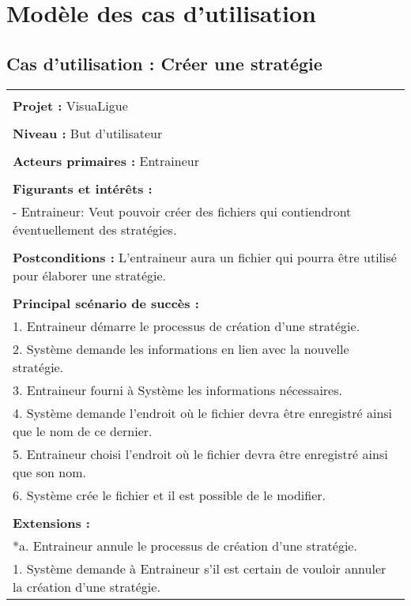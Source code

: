 \chapter{Modèle des cas d'utilisation}
\label{s:use_cases}


\section{Cas d'utilisation : Créer une stratégie}
\begin{longtable}{|p{16cm}|}
	\hline
	\\
	\textbf{Projet :} VisuaLigue\\
	\\
	\textbf{Niveau :} But d'utilisateur\\
	\\
	\textbf{Acteurs primaires :} Entraineur\\
	\\
	\textbf{Figurants et intérêts :} \\
	- Entraineur: Veut pouvoir créer des fichiers qui contiendront éventuellement des stratégies.\\
	\\
	\textbf{Postconditions :} L'entraineur aura un fichier qui pourra être utilisé pour élaborer une stratégie.\\
	\\
	\textbf{Principal scénario de succès :}\\
	1. Entraineur démarre le processus de création d'une stratégie.\\
	2. Système demande les informations en lien avec la nouvelle stratégie.\\
	3. Entraineur fourni à Système les informations nécessaires.\\
	4. Système demande l'endroit où le fichier devra être enregistré ainsi que le nom de ce dernier.\\
	5. Entraineur choisi l'endroit où le fichier devra être enregistré ainsi que son nom.\\
	6. Système crée le fichier et il est possible de le modifier.\\
	\\
	\textbf{Extensions :}\\
	*a. Entraineur annule le processus de création d'une stratégie.\\
	\hspace{1cm}1. Système demande à Entraineur s'il est certain de vouloir annuler la création d'une stratégie.\\

\end{longtable}
